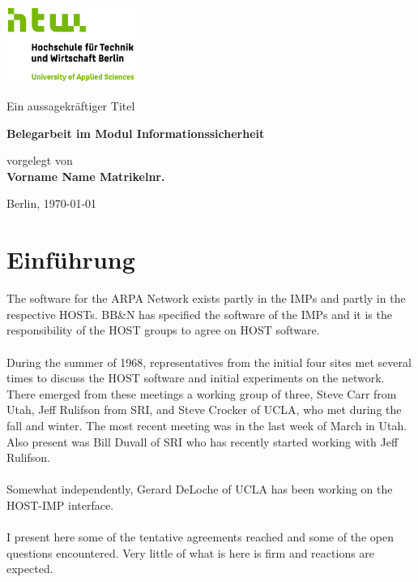 \documentclass[
    a4paper,
    pagesize,
	pdftex,
    12pt,
]{scrartcl}
\begin{document}
\begin{titlepage}
    \begin{center}
        \includegraphics[height=25mm]{S04_HTW_Berlin_Logo_pos_FARBIG_RGB.jpg} \\
        \vspace{1.0cm}

        Ein aussagekräftiger Titel
    
        \vspace{1.5cm}   

        \textbf{Belegarbeit im Modul Informationssicherheit}

        \vspace{1.5cm}

        vorgelegt von \\
        \textbf{Vorname Name Matrikelnr.}%

        \vspace{1.5cm}    
        Berlin, \today\\
    \end{center}
\end{titlepage}


\thispagestyle{empty}
\tableofcontents
\newpage


\section{Einführung}
The software for the ARPA Network exists partly in the IMPs and
partly in the respective HOSTs.  BB\&N has specified the software of
the IMPs and it is the responsibility of the HOST groups to agree on
HOST software. \\ \\
During the summer of 1968, representatives from the initial four
sites met several times to discuss the HOST software and initial
experiments on the network. There emerged from these meetings a
working group of three, Steve Carr from Utah, Jeff Rulifson from SRI,
and Steve Crocker of UCLA, who met during the fall and winter. The
most recent meeting was in the last week of March in Utah. Also
present was Bill Duvall of SRI who has recently started working with
Jeff Rulifson. \\ \\
Somewhat independently, Gerard DeLoche of UCLA has been working on
the HOST-IMP interface. \\ \\
I present here some of the tentative agreements reached and some of
the open questions encountered.  Very little of what is here is firm
and reactions are expected.
\end{document}
